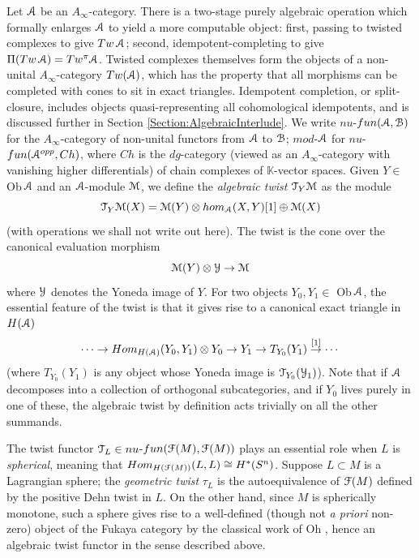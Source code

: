 \documentclass[reqno,10pt]{amsart}
\numberwithin{equation}{section}
\newcommand{\bK}{{\mathbb K}}
\newcommand{\scrY}{\EuScript{Y}}
\newcommand{\scrT}{\EuScript{T}}
\newcommand{\scrF}{\EuScript{F}}
\newcommand{\scrA}{\EuScript{A}}
\newcommand{\scrB}{\EuScript{B}}
\newcommand{\scrM}{\EuScript{M}}
\theoremstyle{remark}
\begin{document}
Let $\scrA$ be an $A_{\infty}$-category.   There is a two-stage purely algebraic operation which formally enlarges $\scrA$ to yield a more computable object:  first, passing to twisted complexes to give $Tw \, \scrA$; second, idempotent-completing to give $\Pi(Tw\,\scrA) = Tw^{\pi}\scrA$.  Twisted complexes themselves form the objects of a non-unital $A_{\infty}$-category $Tw(\scrA)$, which has the property that all morphisms can be completed with cones to sit in exact triangles.   Idempotent completion, or split-closure, includes objects quasi-representing all cohomological idempotents, and is discussed further in Section \ref{Section:AlgebraicInterlude}.  We write $nu$-$fun(\scrA,\scrB)$ for the $A_{\infty}$-category of non-unital functors from $\scrA$ to $\scrB$; $mod$-$\scrA$ for $nu$-$fun(\scrA^{opp},Ch)$, where $Ch$ is the $dg$-category  (viewed as an $A_{\infty}$-category with vanishing higher differentials) of chain complexes of $\bK$-vector spaces.  Given $Y \in$ Ob$\,\scrA$ and an $\scrA$-module $\scrM$, we define the \emph{algebraic twist} $\scrT_Y\scrM$ as the module
\[
\scrT_Y\scrM(X) = \scrM(Y)\otimes hom_{\scrA}(X,Y)[1] \oplus \scrM(X)
\]
(with operations we shall not write out here).    The twist is the cone over the canonical evaluation morphism
\[
\scrM(Y) \otimes \scrY \rightarrow \scrM
\]
where $\scrY$ denotes the Yoneda image of $Y$.  For two objects $Y_0, Y_1 \in$ Ob$\, \scrA$, the essential feature of the twist is that it gives rise to a canonical exact triangle in $H(\scrA)$
\[
\cdots \rightarrow Hom_{H(\scrA)}(Y_0,Y_1) \otimes Y_0 \rightarrow Y_1 \rightarrow T_{Y_0}(Y_1) \stackrel{[1]}{\rightarrow} \cdots
\]
(where $T_{Y_0}(Y_1)$ is any object whose Yoneda image is $\scrT_{Y_0}(\scrY_1)$).  Note that if $\scrA$ decomposes into a collection of orthogonal subcategories, and if $Y_0$ lives purely in one of these, the algebraic twist by definition acts trivially on all the other summands.

 The twist functor $\scrT_L \in nu$-$fun(\scrF(M),\scrF(M))$ plays an essential role when $L$ is \emph{spherical}, meaning that $Hom_{H(\scrF(M))}(L,L) \cong H^*(S^n)$.  Suppose $L\subset M$ is a Lagrangian sphere;  the \emph{geometric twist} $\tau_L$ is the autoequivalence of $\scrF(M)$ defined by the positive Dehn twist in $L$.  On the other hand, since $M$ is spherically monotone, such a sphere gives rise to a well-defined (though not \emph{a priori} non-zero) object of the Fukaya category by the classical work of Oh \cite{Oh}, hence an algebraic twist functor in the sense described above. 
\end{document}
